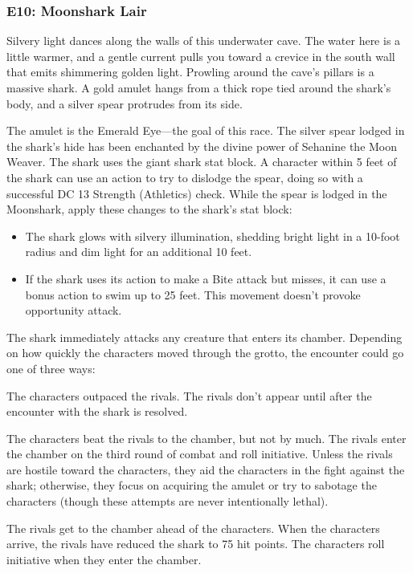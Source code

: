 \documentclass[10pt,a4paper,twoside,bg=print,twocolumn,openany,nodeprecatedcode]{dndbook}
\begin{document}
\subsubsection{E10: Moonshark Lair}
\begin{DndReadAloud}{}
Silvery light dances along the walls of this underwater cave. The water here is a little warmer, and a gentle current pulls you toward a crevice in the south wall that emits shimmering golden light. Prowling around the cave's pillars is a massive shark. A gold amulet hangs from a thick rope tied around the shark's body, and a silver spear protrudes from its side.

\end{DndReadAloud}

The amulet is the Emerald Eye—the goal of this race. The silver spear lodged in the shark's hide has been enchanted by the divine power of Sehanine the Moon Weaver. The shark uses the giant shark stat block. A character within 5 feet of the shark can use an action to try to dislodge the spear, doing so with a successful DC 13 Strength (Athletics) check. While the spear is lodged in the Moonshark, apply these changes to the shark's stat block:


\begin{itemize}
\item The shark glows with silvery illumination, shedding bright light in a 10-foot radius and dim light for an additional 10 feet.
\item If the shark uses its action to make a Bite attack but misses, it can use a bonus action to swim up to 25 feet. This movement doesn't provoke opportunity attack.
\end{itemize}

The shark immediately attacks any creature that enters its chamber. Depending on how quickly the characters moved through the grotto, the encounter could go one of three ways:


\begin{description}[nolistsep]
\item[Fast Pace (10 or Fewer Rounds).]
The characters outpaced the rivals. The rivals don't appear until after the encounter with the shark is resolved.
\item[Moderate Pace (Between 11 and 15 Rounds).]
The characters beat the rivals to the chamber, but not by much. The rivals enter the chamber on the third round of combat and roll initiative. Unless the rivals are hostile toward the characters, they aid the characters in the fight against the shark; otherwise, they focus on acquiring the amulet or try to sabotage the characters (though these attempts are never intentionally lethal).
\item[Slow Pace (16 or More Rounds).]
The rivals get to the chamber ahead of the characters. When the characters arrive, the rivals have reduced the shark to 75 hit points. The characters roll initiative when they enter the chamber.
\end{description}
\end{document}
